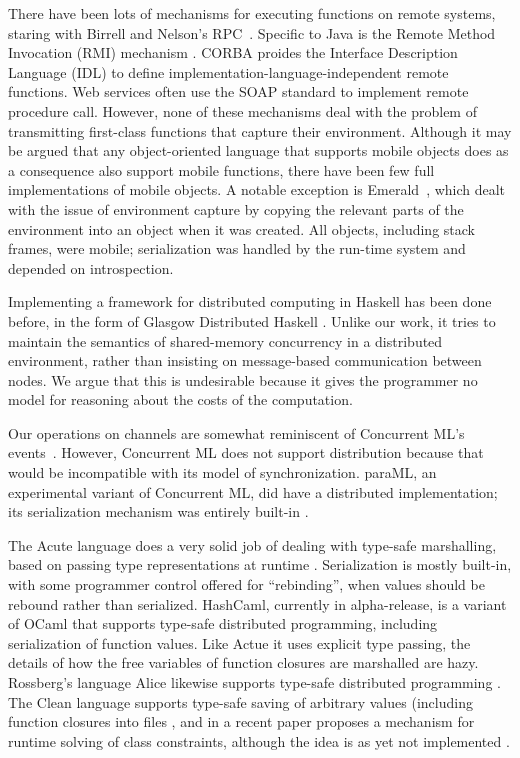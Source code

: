\documentclass[preprint]{sigplanconf}
\begin{document}
There have been lots of mechanisms for executing functions on remote
systems, staring with Birrell and Nelson's RPC~\cite{birrel1984}.
Specific to Java is the Remote Method Invocation (RMI) mechanism
\cite{javarmi}. CORBA proides the Interface Description Language (IDL)
\cite{corbaidl} to define implementation-language-independent remote
functions. Web services often use the SOAP standard to implement
remote procedure call.  However, none of these mechanisms deal with the problem of transmitting first-class functions that capture their environment.
Although it may be argued that any object-oriented language that supports mobile objects does as a consequence also support mobile functions, there have been few full implementations of mobile objects.  A notable exception is Emerald~\cite{jul1988}, which dealt with the issue of environment capture  by copying the relevant parts of the environment into an object when it was created.  
All objects, including stack frames, were mobile; serialization was handled by the run-time system and depended on introspection.

Implementing a framework for distributed computing in Haskell has been
done before, in the form of Glasgow Distributed Haskell
\cite{gdh2001}. Unlike our work, it tries to maintain the semantics of
shared-memory concurrency in a distributed environment, rather than
insisting on message-based communication between nodes. We argue that this is 
undesirable because it gives the programmer no model for reasoning about the costs of the computation.  

Our operations on channels are somewhat reminiscent of Concurrent ML's events~\cite{reppy:book}.
However, Concurrent ML does not support distribution because that would be incompatible with its
model of synchronization.  paraML, an experimental variant of Concurrent ML, did have
a distributed implementation; its serialization mechanism was entirely built-in \cite{bailey:paraml}.

The Acute language does a very solid job of dealing with type-safe
marshalling, based on passing type representations at runtime
\cite{acute:jfp}.  Serialization is mostly built-in, with some
programmer control offered for ``rebinding'', when values should be
rebound rather than serialized.  HashCaml, currently in alpha-release, is a
variant of OCaml that supports type-safe distributed
programming, including serialization of function values.  Like Actue
it uses explicit type passing, the details of how the free variables
of function closures are marshalled are hazy.  Rossberg's language
Alice likewise supports type-safe distributed programming
\cite{rossberg:alice}.  
The Clean language supports type-safe saving of arbitrary values (including
function closures into files \cite{clean:dynamic-io}, and in a recent
paper proposes a mechanism for runtime solving of class constraints, although
the idea is as yet not implemented
\cite[Sect 4.2]{clean:wgp10}.
\end{document}
